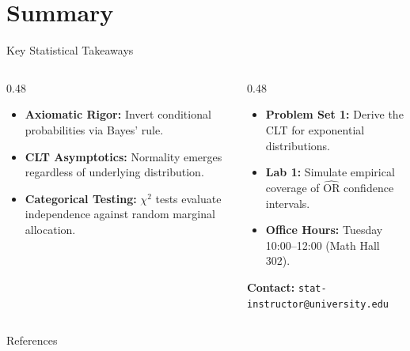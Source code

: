 \documentclass[aspectratio=169, 9pt]{beamer}
\begin{document}
\section{Summary}
\begin{frame}{Key Statistical Takeaways}
    \begin{columns}[t]
        \begin{column}{0.48\textwidth}
            \par\vspace{0.3em}
            \begin{itemize}\setlength{\itemsep}{2.5pt}
                \item \textbf{Axiomatic Rigor:} Invert conditional probabilities via Bayes' rule.
                \item \textbf{CLT Asymptotics:} Normality emerges regardless of underlying distribution.
                \item \textbf{Categorical Testing:} $\chi^2$ tests evaluate independence against random marginal allocation.
            \end{itemize}
        \end{column}
        \begin{column}{0.48\textwidth}
            \par\vspace{0.3em}
            \begin{itemize}\setlength{\itemsep}{2.5pt}
                \item \textbf{Problem Set 1:} Derive the CLT for exponential distributions.
                \item \textbf{Lab 1:} Simulate empirical coverage of $\widehat{\mathrm{OR}}$ confidence intervals.
                \item \textbf{Office Hours:} Tuesday 10:00--12:00 (Math Hall 302).
            \end{itemize}
            \vspace{0.3em}
            \begin{takeaway}
                \textbf{Contact:} \texttt{stat-instructor@university.edu}
            \end{takeaway}
        \end{column}
    \end{columns}
\end{frame}

\begin{frame}[allowframebreaks]{References}
    \printbibliography
\end{frame}
\end{document}
